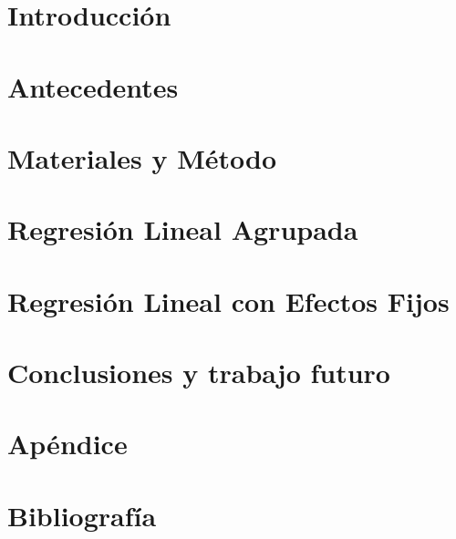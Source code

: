 \documentclass[11pt,a4paper,twoside]{tesis}
\begin{document}
\def\titulo{Licenciado }

\def\autor{Juan Manuel Pérez}
\def\tituloTesis{Mimetización entre interlocutores}
\def\runtitulo{Medición de la mimetización entre interlocutores utilizando series de tiempo}
\def\runtitle{Measuring entrainment between speakers using time series}
\def\director{Agustín Gravano}
\def\codirector{Ramiro Gálvez}
\def\lugar{Buenos Aires, 2015}


\frontmatter
\pagestyle{empty}




\listoftodos

\tableofcontents

\mainmatter
\pagestyle{headings}



\chapter{Introducción}



\chapter{Antecedentes}


\chapter{Materiales y Método}


\chapter{Regresión Lineal Agrupada}


\chapter{Regresión Lineal con Efectos Fijos}


\chapter{Conclusiones y trabajo futuro}


\chapter{Apéndice}



\chapter{Bibliografía}
\backmatter



\end{document}
